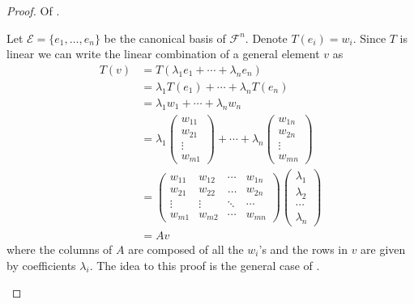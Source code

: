 \begin{proof}
	Of .
	\begin{flushleft}
		Let $\mathcal{E}=\{e_1,\dots,e_n\}$ be the canonical basis of $\mathcal{F}^n$.
		Denote $T(e_i)=w_i$. Since $T$ is linear we can write the linear combination
		of a general element $v$ as
		\begin{align*}
			T(v) & =T(\lambda_1e_1+\cdots+\lambda_ne_n)                                              \\
			     & =\lambda_1T(e_1)+\cdots+\lambda_nT(e_n)                                           \\
			     & =\lambda_1w_1+\cdots+\lambda_nw_n                                                 \\
			     & =\lambda_1\begin{pmatrix}
				w_{11} \\ w_{21} \\ \vdots \\ w_{m1}
			\end{pmatrix}+\cdots+\lambda_n\begin{pmatrix}
				w_{1n} \\ w_{2n} \\ \vdots \\ w_{mn}
			\end{pmatrix} \\
			     & =\begin{pmatrix}
				w_{11} & w_{12} & \cdots & w_{1n} \\
				w_{21} & w_{22} & \dots  & w_{2n} \\
				\vdots & \vdots & \ddots & \cdots \\
				w_{m1} & w_{m2} & \cdots & w_{mn}
			\end{pmatrix}\begin{pmatrix}
				\lambda_1 \\
				\lambda_2 \\
				\cdots    \\
				\lambda_n
			\end{pmatrix}                           \\
			     & =Av
		\end{align*}
		where the columns of $A$ are composed of all the $w_i$'s and the rows in $v$
		are given by coefficients $\lambda_i$. The idea to this proof is the general
		case of .
	\end{flushleft}
\end{proof}

